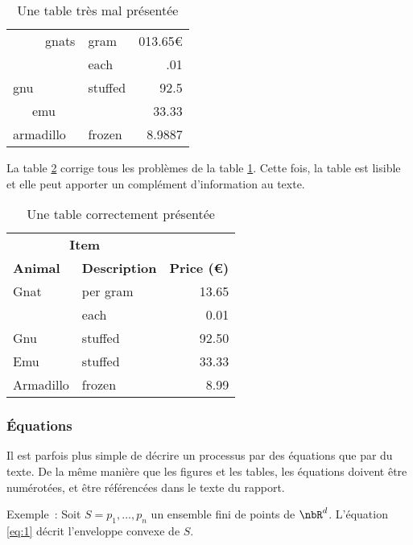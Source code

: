 \begin{table}[htbp]
  \centering
\begin{tabular}{||l|lr||} 
\hline
\hline
~~~~~gnats     & gram      & 013.65\euro \\ \cline{2-3}
          & each      & .01 \\ \hline
gnu       & stuffed   & 92.5 \\ \cline{1-1} \cline{3-3}
~~~emu       &           & 33.33 \\ \hline
armadillo & frozen    & 8.9887 \\ \hline
\end{tabular}
  \caption{Une table très mal présentée}
  \label{tab:tab1}
\end{table}

La table \ref{tab:tab2} corrige tous les problèmes de la table
\ref{tab:tab1}. Cette fois, la table est lisible et elle peut apporter un
complément d'information au texte.

\begin{table}[htbp]
  \centering
\begin{tabular}{@{}llr@{}} 
  \toprule
  \multicolumn{2}{c}{\textbf{Item}} \\ 
  \cmidrule(r){1-2}
  \textbf{Animal} & \textbf{Description} & \textbf{Price (\euro)}\\ 
  \midrule
  Gnat  & per gram  & 13.65 \\
           & each      & 0.01 \\
      Gnu   & stuffed   & 92.50 \\
      Emu   & stuffed   & 33.33 \\
      Armadillo & frozen & 8.99 \\ 
      \bottomrule
\end{tabular}
  \caption{Une table correctement présentée}
  \label{tab:tab2}
\end{table}

\subsubsection{Équations}

Il est parfois plus simple de décrire un processus par des équations que par
du texte. 
De la même manière que les figures et les tables, les équations
doivent être numérotées, et être référencées dans le texte du
rapport. 

Exemple~: Soit $S={p_1,\ldots,p_n}$ un ensemble fini de points de
$\nbR^d$. L'équation \eqref{eq:1} décrit l'enveloppe convexe de $S$.

